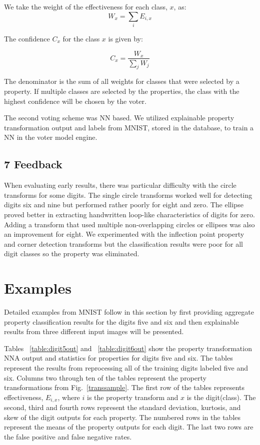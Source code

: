 \documentclass[conference]{IEEEtran}
\begin{document}
We take the weight of the effectiveness for each class, $x$, as:
\begin{equation}\label{weight}
W_x=\sum_i E_{i, x}
\end{equation}

The confidence $C_x$ for the class $x$ is given by:

\begin{equation}\label{conf}
C_x=\frac{W_x}{\sum\limits_jW_j}
\end{equation}

The denominator is the sum of all weights for classes that were selected by a property.  If multiple classes are selected by the properties, the class with the highest confidence will be chosen by the voter.

The second voting scheme was NN based.  We utilized explainable property transformation output and labels from MNIST, stored in the database, to train a NN in the voter model engine.

\subsection{7 Feedback}

When evaluating early results, there was particular difficulty with the circle transforms for some digits.   The single circle transforms worked well for detecting digits six and nine but performed rather poorly for eight and zero.  The ellipse proved better in extracting handwritten loop-like characteristics of digits for zero.   Adding a transform that used multiple non-overlapping circles or ellipses was also an improvement for eight.  We experimented with the inflection point property and corner detection transforms but the classification results were poor for all digit classes so the property was eliminated.

\section{Examples}

Detailed examples from MNIST follow in this section by first providing aggregate property classification results for the digits five and six and then explainable results from three different input images will be presented.

Tables ~\ref{table:digit5out} and ~\ref{table:digit6out} show the property transformation NNA output and statistics for properties for digits five and six.  The tables represent the results from reprocessing all of the training digits labeled five and six.  Columns two through ten of the tables represent the property transformations from Fig.~\ref{transsample}.  The first row of the tables represents effectiveness, $E_{i,x}$, where $i$ is the property transform and $x$ is the digit(class).  The second, third and fourth rows represent the standard deviation, kurtosis, and skew of the digit outputs for each property.  The numbered rows in the tables represent the means of the property outputs for each digit.  The last two rows are the false positive and false negative rates.
\end{document}
